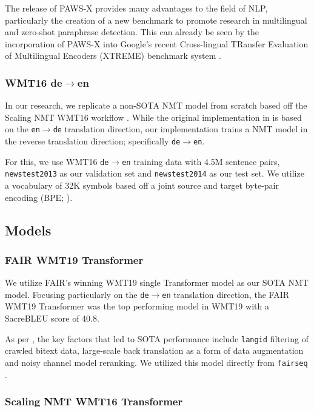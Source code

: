 \documentclass[11pt,a4paper]{article}
\begin{document}
The release of PAWS-X provides many advantages to the field of NLP, particularly the creation of a new benchmark to promote research in multilingual and zero-shot paraphrase detection. This can already be seen by the incorporation of PAWS-X into Google's recent Cross-lingual TRansfer Evaluation of Multilingual Encoders (XTREME) benchmark system \cite{hu2020xtreme}.

\subsubsection{WMT16 de$\rightarrow$en}

In our research, we replicate a non-SOTA NMT model from scratch based off the Scaling NMT WMT16 workflow \cite{ott2018scaling}. While the original implementation in \citet{ott2018scaling} is based on the \texttt{en$\rightarrow$de} translation direction, our implementation trains a NMT model in the reverse translation direction; specifically \texttt{de$\rightarrow$en}.

For this, we use WMT16 \texttt{de$\rightarrow$en} training data with 4.5M sentence pairs, \texttt{newstest2013} as our validation set and \texttt{newstest2014} as our test set. We utilize a vocabulary of 32K symbols based off a joint source and target byte-pair encoding (BPE; \citealt{sennrich2015neural}).   

\subsection{Models}

\subsubsection{FAIR WMT19 Transformer}

We utilize FAIR's winning WMT19 single Transformer model as our SOTA NMT model. Focusing particularly on the \texttt{de$\rightarrow$en} translation direction, the FAIR WMT19 Transformer was the top performing model in WMT19 with a SacreBLEU \cite{post-2018-call} score of 40.8.

As per \citet{ng2019facebook}, the key factors that led to SOTA performance include \texttt{langid} filtering of crawled bitext data, large-scale back translation as a form of data augmentation and noisy channel model reranking. We utilized this model directly from \texttt{fairseq} \cite{ott2019fairseq}. 

\subsubsection{Scaling NMT WMT16 Transformer}
\end{document}
